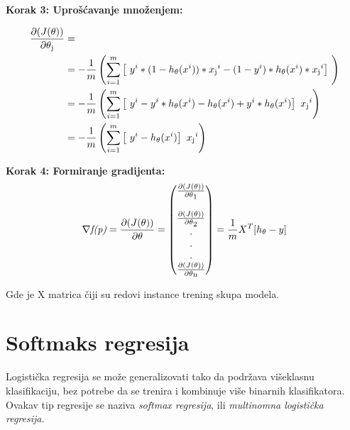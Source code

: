 \documentclass[a4paper,12pt]{report}
\begin{document}
\textbf{Korak 3: Uprošćavanje množenjem:} 

\begin{equation}
\begin{split}
	\frac{\partial (J(\theta))}{\partial \theta\textsubscript{j}} & = \\
	 & = - \frac{1}{m} \left( \sum_{i=1}^{m} \left[\ y^i * (1-{h\textsubscript {$\theta$} (x^i)})  * x\textsubscript{j}^i  - (1 - y^i)  * {h\textsubscript {$\theta$} (x^i)}  * x\textsubscript{j}^i\right]\ \right) \\
	  & = - \frac{1}{m} \left( \sum_{i=1}^{m} \left[\ y^i  - y^i * {h\textsubscript {$\theta$} (x^i)} - {h\textsubscript {$\theta$} (x^i)} + y^i  * {h\textsubscript {$\theta$} (x^i)} \right]\ x\textsubscript{j}^i  \right)  \\
	   & = - \frac{1}{m} \left( \sum_{i=1}^{m} \left[\ y^i  - {h\textsubscript {$\theta$} (x^i)} \right]\ x\textsubscript{j}^i  \right)  \\
\end{split}
\end{equation}

\textbf{Korak 4: Formiranje gradijenta:}
\begin{equation}
\begin{split}
\nabla \textit{f(p)} = \frac{\partial (J(\theta))}{\partial \theta} =
\begin{pmatrix} \frac{\partial (J(\theta))}{\partial \theta\textsubscript{1}} \\\\ \frac{\partial (J(\theta))}{\partial \theta\textsubscript{2}} \\.\\ .\\.\\ \frac{\partial (J(\theta))}{\partial \theta\textsubscript{n}} \end{pmatrix}
= \frac{1}{m} X^T [ h\textsubscript {$\theta$} - y ]
\end{split}
\end{equation}

Gde je X matrica čiji su redovi instance trening skupa modela. \\

\section{Softmaks regresija}

Logistička regresija se može generalizovati tako da podržava višeklasnu klasifikaciju, bez potrebe da se trenira i kombinuje više binarnih klasifikatora. Ovakav tip regresije se naziva \textit{softmax regresija}, ili \textit{multinomna logistička regresija}. \\
\end{document}
